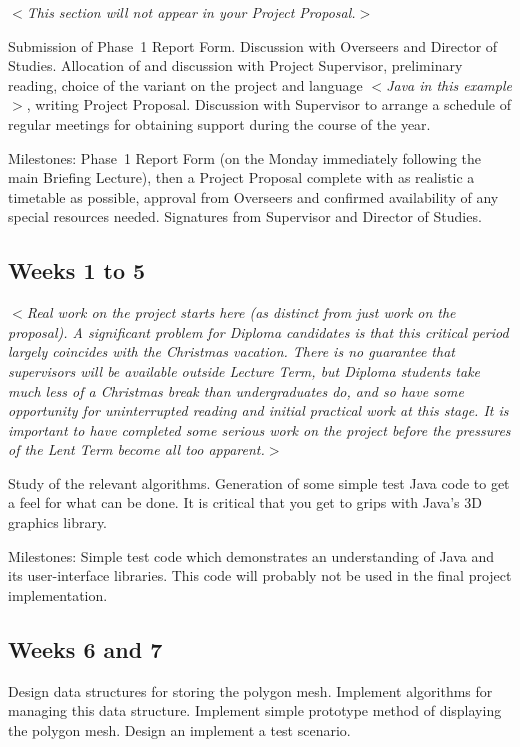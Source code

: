 \documentclass[12pt]{article}
\newcommand{\al}{$<$}
\newcommand{\ar}{$>$}
\begin{document}
\al\emph{This section will not appear in your Project Proposal.}\ar
 
Submission of Phase~1 Report Form. Discussion with Overseers and
Director of Studies.  Allocation of and discussion with Project
Supervisor, preliminary reading, choice of the variant on the project
and language \al\emph{Java in this example\/}\ar, writing Project
Proposal.  Discussion with Supervisor to arrange a schedule of regular
meetings for obtaining support during the course of the year.

Milestones: Phase~1 Report Form (on the Monday immediately following
the main Briefing Lecture), then a Project Proposal complete with as
realistic a timetable as possible, approval from Overseers and
confirmed availability of any special resources needed. Signatures
from Supervisor and Director of Studies.


\subsection*{Weeks 1 to 5}

\al\emph{Real work on the project starts here (as distinct from just
  work on the proposal).  A significant problem for Diploma candidates
  is that this critical period largely coincides with the Christmas
  vacation.  There is no guarantee that supervisors will be available
  outside Lecture Term, but Diploma students take much less of a
  Christmas break than undergraduates do, and so have some opportunity
  for uninterrupted reading and initial practical work at this stage.
  It is important to have completed some serious work on the project
  before the pressures of the Lent Term become all too apparent.}\ar

Study of the relevant algorithms.  Generation of some simple test
Java code to get a feel for what can be done. It is critical that you
get to grips with Java's 3D graphics library.

Milestones: Simple test code which demonstrates an understanding of
Java and its user-interface libraries.  This code will probably
not be used in the final project implementation.


\subsection*{Weeks 6 and 7}

Design data structures for storing the polygon mesh.  Implement
algorithms for managing this data structure.  Implement simple
prototype method of displaying the polygon mesh.  Design an implement
a test scenario.
\end{document}
